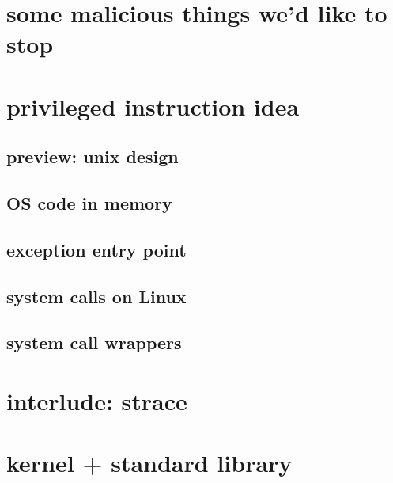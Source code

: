 \section{some malicious things we'd like to stop}



\section{privileged instruction idea}


\subsection{preview: unix design}


\subsection{OS code in memory}


\subsection{exception entry point}


\subsection{system calls on Linux}


\subsection{system call wrappers}

% 

\section{interlude: strace}


\section{kernel + standard library}

